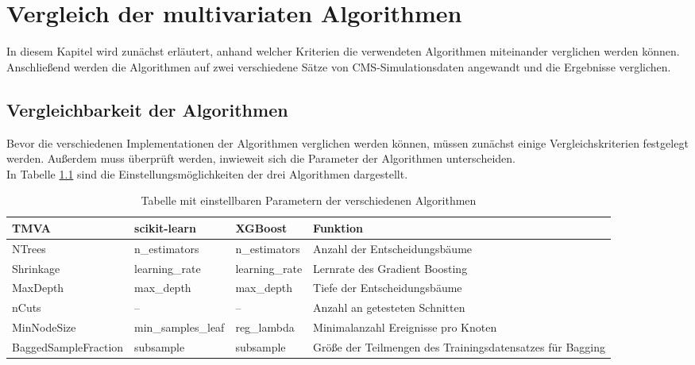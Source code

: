 \chapter{Vergleich der multivariaten Algorithmen}
\label{ch:vergleich}

{}

In diesem Kapitel wird zun\"achst erl\"autert, anhand welcher Kriterien die verwendeten Algorithmen miteinander verglichen werden k\"onnen. Anschlie\ss end werden die Algorithmen auf zwei verschiedene S\"atze von CMS-Simulationsdaten angewandt und die Ergebnisse verglichen.

\section{Vergleichbarkeit der Algorithmen}
\label{ch:Vergleich:sec:Vergleichbarkeit}

Bevor die verschiedenen Implementationen der Algorithmen verglichen werden k\"onnen, m\"ussen zun\"achst einige Vergleichskriterien festgelegt werden. Au\ss erdem muss \"uberpr\"uft werden, inwieweit sich die Parameter der Algorithmen unterscheiden.\\
In Tabelle \ref{tab:parameter} sind die Einstellungsm\"oglichkeiten der drei Algorithmen dargestellt.

\begin{table}[tbp]\parbox{12cm}{
  \caption[Algorithmenparameter]{Tabelle mit einstellbaren Parametern der verschiedenen Algorithmen}%
  }\label{tab:parameter}
  \begin{center}
  \begin{tabular}{p{3.75cm}p{2.75cm}p{2.25cm}p{4.5cm}}
  \hline
  {\bf TMVA} & {\bf scikit-learn} & {\bf XGBoost} & {\bf Funktion} \\
  \hline \hline
     NTrees	& n\_estimators & n\_estimators & Anzahl der Entscheidungsb\"aume \\
     Shrinkage	& learning\_rate & learning\_rate & Lernrate des Gradient Boosting \\
     MaxDepth & max\_depth & max\_depth & Tiefe der Entscheidungsb\"aume\\
     nCuts & -- & -- & Anzahl an getesteten Schnitten\\ 
  	 MinNodeSize & min\_samples\_leaf & reg\_lambda & Minimalanzahl Ereignisse pro Knoten\\ 
  	 BaggedSampleFraction & subsample & subsample & Gr\"o\ss e der Teilmengen des Trainingsdatensatzes f\"ur Bagging\\                     
  \hline
  \end{tabular}
  \end{center}
\end{table}

